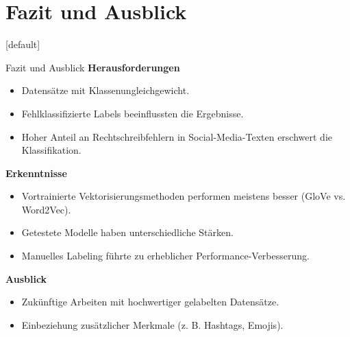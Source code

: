 \documentclass[aspectratio=169]{beamer} %
\begin{document}
\section{Fazit und Ausblick}
[default]
\begin{frame}{Fazit und Ausblick}
\textbf{Herausforderungen}
\begin{itemize}
    \item Datensätze mit Klassenungleichgewicht.
    \item Fehlklassifizierte Labels beeinflussten die Ergebnisse.
    \item Hoher Anteil an Rechtschreibfehlern in Social-Media-Texten erschwert die Klassifikation.
\end{itemize}

\textbf{Erkenntnisse}
\begin{itemize}
    \item Vortrainierte Vektorisierungsmethoden performen meistens besser (GloVe vs. Word2Vec).
    \item Getestete Modelle haben unterschiedliche Stärken.
   \item Manuelles Labeling führte zu erheblicher Performance-Verbesserung.
    
\end{itemize}

\textbf{Ausblick}
\begin{itemize}
    \item Zukünftige Arbeiten mit hochwertiger gelabelten Datensätze.
    \item Einbeziehung zusätzlicher Merkmale (z. B. Hashtags, Emojis).
\end{itemize}
\end{frame}





\begin{frame}
  \titlepage
\end{frame}
\nologo
\end{document}
